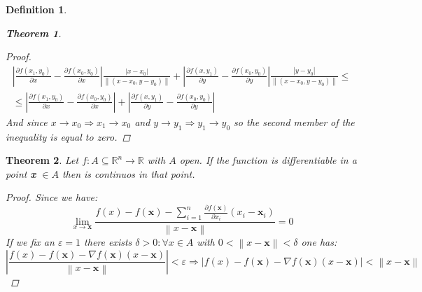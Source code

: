 \documentclass{article}
\newtheorem{theorem}{Theorem}
\newtheorem{definition}{Definition}
\begin{document}
\begin{definition}
\begin{theorem}
\begin{proof}
\begin{gather*}
                        \left\lvert \frac{\partial f(x_1,y_0)}{\partial x} - \frac{\partial f(x_0,y_0)}{\partial x} \right\rvert \frac{\left\lvert x - x_0\right\rvert}{\left\lVert (x-x_0,y-y_0)\right\rVert } + \left\lvert \frac{\partial f(x,y_1)}{\partial y} - \frac{\partial f(x_0,y_0)}{\partial y}\right\rvert \frac{\left\lvert y - y_0\right\rvert}{\left\lVert (x-x_0,y-y_0) \right\rVert } \leq \\ \leq \left\lvert \frac{\partial f(x_1,y_0)}{\partial x} - \frac{\partial f(x_0,y_0)}{\partial x} \right\rvert + \left\lvert \frac{\partial f(x,y_1)}{\partial y} - \frac{\partial f(x_0,y_0)}{\partial y}\right\rvert
                    \end{gather*}
                And since $x \to x_0 \Rightarrow x_1 \to x_0$ and $y \to y_1 \Rightarrow y_1 \to y_0$ so the second member of the inequality is equal to zero.
            \end{proof}
        \end{theorem}
    \end{definition}
    \begin{theorem} %
        Let $f : A \subseteq \mathbb{R}^n \rightarrow \mathbb{R}$ with $A$ open. If the function is differentiable in a point \textbf{x} $\in A$ then is continuos in that point.
        \begin{proof}
            Since we have:
            \begin{equation*}
                \lim_{x \to \textbf{x}}\frac{f(x) - f(\textbf{x}) - \sum_{i = 1}^{n} \frac{\partial f(\textbf{x})}{\partial x_i} \left(x_i - \textbf{x}_i \right)}{\left\lVert x - \textbf{x}\right\rVert} = 0
            \end{equation*}
            If we fix an $\varepsilon = 1$ there exists $\delta > 0 : \forall x \in A$ with $0 < \left\lVert x - \textbf{x} \right\rVert < \delta$ one has:
            \begin{equation*}
                \left\lvert \frac{f(x) - f(\textbf{x}) - \nabla f(\textbf{x})(x - \textbf{x})}{\left\lVert x - \textbf{x}\right\rVert} \right\rvert < \varepsilon \Longrightarrow \left\lvert f(x) - f(\textbf{x}) - \nabla f(\textbf{x})(x - \textbf{x}) \right\rvert < \left\lVert x - \textbf{x}\right\rVert
            \end{equation*}
        \end{proof}
    \end{theorem}
    \newpage
\end{document}
